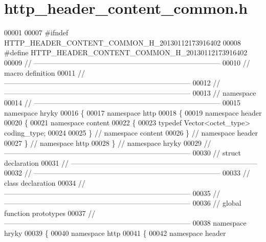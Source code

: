 \hypertarget{http__header__content__common_8h_source}{\section{http\-\_\-header\-\_\-content\-\_\-common.\-h}
}

\begin{DoxyCode}
00001 
00007 \textcolor{preprocessor}{#ifndef HTTP\_HEADER\_CONTENT\_COMMON\_H\_20130112173916402}
00008 \textcolor{preprocessor}{}\textcolor{preprocessor}{#define HTTP\_HEADER\_CONTENT\_COMMON\_H\_20130112173916402}
00009 \textcolor{preprocessor}{}\textcolor{comment}{//
      ------------------------------------------------------------------------------}
00010 \textcolor{comment}{// macro definition}
00011 \textcolor{comment}{//
      ------------------------------------------------------------------------------}
00012 \textcolor{comment}{//
      ------------------------------------------------------------------------------}
00013 \textcolor{comment}{// namespace}
00014 \textcolor{comment}{//
      ------------------------------------------------------------------------------}
00015 \textcolor{keyword}{namespace }hryky
00016 \{
00017 \textcolor{keyword}{namespace }http
00018 \{
00019 \textcolor{keyword}{namespace }header
00020 \{
00021 \textcolor{keyword}{namespace }content
00022 \{
00023     \textcolor{keyword}{typedef} Vector<octet\_type> coding\_type;
00024     
00025 \} \textcolor{comment}{// namespace content}
00026 \} \textcolor{comment}{// namespace header}
00027 \} \textcolor{comment}{// namespace http}
00028 \} \textcolor{comment}{// namespace hryky}
00029 \textcolor{comment}{//
      ------------------------------------------------------------------------------}
00030 \textcolor{comment}{// struct declaration}
00031 \textcolor{comment}{//
      ------------------------------------------------------------------------------}
00032 \textcolor{comment}{//
      ------------------------------------------------------------------------------}
00033 \textcolor{comment}{// class declaration}
00034 \textcolor{comment}{//
      ------------------------------------------------------------------------------}
00035 \textcolor{comment}{//
      ------------------------------------------------------------------------------}
00036 \textcolor{comment}{// global function prototypes}
00037 \textcolor{comment}{//
      ------------------------------------------------------------------------------}
00038 \textcolor{keyword}{namespace }hryky
00039 \{
00040 \textcolor{keyword}{namespace }http
00041 \{
00042 \textcolor{keyword}{namespace }header

\end{DoxyCode}
